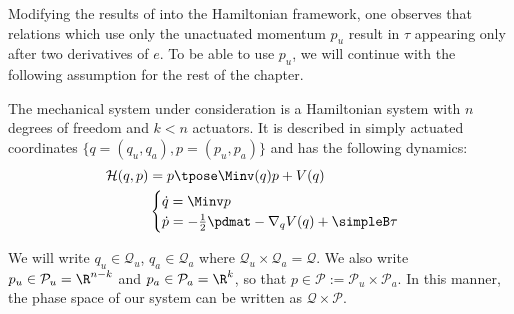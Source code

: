 Modifying the results of
\cite{nhvc_dynamic_walking,hybrid_zero_dynamics_bipedal_nhvcs,nhvc_incline_walking}
into the Hamiltonian framework, one observes that
relations which use only the unactuated momentum \(p_u\) result in \(\tau\)
appearing only after two derivatives of \(e\).
To be able to use \(p_u\), we will continue with the following assumption for
the rest of the chapter.

\begin{assm}\label{assm:H-is-simply-actuated}
    The mechanical system under consideration is a
    Hamiltonian system with \(n\) degrees of freedom and 
    \(k < n\) actuators. It is described in simply
    actuated coordinates \(\{q = (q_u,q_a), p = (p_u, p_a)\}\) and has the
    following dynamics:
    \begin{align*}
        \mathcal{H}(q,p) &= p\tpose \Minv(q) p + V(q) \\
         &\begin{cases}
            \dot{q} = \Minv p \\
            \dot{p} = -\frac{1}{2} \pdmat - \nabla_q V(q) + \simpleB \tau \\
        \end{cases}
    \end{align*}
\end{assm}
\begin{notation}
    We will write \(q_u \in \mathcal{Q}_u\), \(q_a \in \mathcal{Q}_a\) where
    \(\mathcal{Q}_u \times \mathcal{Q}_a = \mathcal{Q}\). 
    We also write
    \(p_u \in \mathcal{P}_u = \R^{n-k}\) and 
    \(p_a \in \mathcal{P}_a = \R^k\), so that 
    \(p \in \mathcal{P} := \mathcal{P}_u \times \mathcal{P}_a\). 
    In this manner, the phase space of our system can be written as
    \(\mathcal{Q} \times \mathcal{P}\).
\end{notation}

